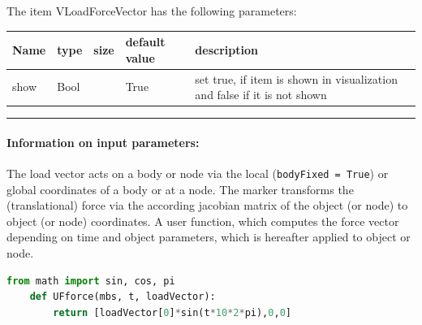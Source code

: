 \noindent The item VLoadForceVector has the following parameters:
\begin{center}
  \footnotesize
  \begin{longtable}{| p{4.5cm} | p{2.5cm} | p{0.5cm} | p{2.5cm} | p{6cm} |}
    \hline
    \bf Name & \bf type & \bf size & \bf default value & \bf description \\ \hline
    show &     Bool &      &     True &     set true, if item is shown in visualization and false if it is not shown\\ \hline
\end{longtable}
\end{center}
\par\noindent\rule{\textwidth}{0.4pt}
\label{description_LoadForceVector}
\paragraph{Information on input parameters:} 
\finishTable
 \noindent
    The load vector acts on a body or node via the local (\texttt{bodyFixed = True}) or global coordinates of a body or at a node. 
    The marker transforms the (translational) force via the according jacobian matrix of the object (or node) to object (or node) coordinates.
    A user function, which computes the force vector depending on time and object parameters, which is hereafter applied to object or node.
    \finishTable
    \userFunctionExample{}
    \pythonstyle
    \begin{lstlisting}[language=Python]
    from math import sin, cos, pi
    def UFforce(mbs, t, loadVector): 
        return [loadVector[0]*sin(t*10*2*pi),0,0]
    \end{lstlisting}
